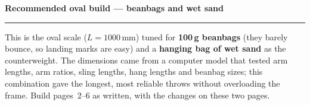 \documentclass[11pt,a4paper]{article}
\begin{document}
\newpage
{\LARGE\bfseries\color{Ink} Recommended oval build --- beanbags and wet sand}\\[3pt]
{\color{RuleGrey}\rule{\linewidth}{1.2pt}}

This is the oval scale ($L = 1000$\,mm) tuned for \textbf{100\,g beanbags} (they barely bounce, so landing marks are easy) and a \textbf{hanging bag of wet sand} as the counterweight. The dimensions came from a computer model that tested arm lengths, arm ratios, sling lengths, hang lengths and beanbag sizes; this combination gave the longest, most reliable throws without overloading the frame. Build pages~2--6 as written, with the changes on these two pages.
\end{document}
